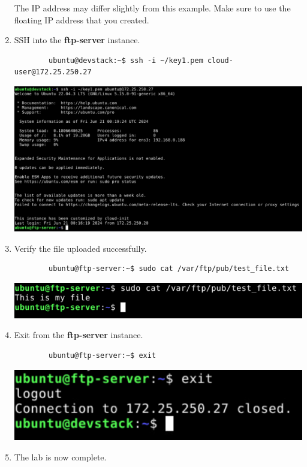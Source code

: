 \documentclass[letterpaper, 12pt]{article}
\begin{document}
\begin{enumerate}
    \begin{notebox}
        The IP address may differ slightly from this example. Make sure to use the floating IP address that you created.
    \end{notebox}

    \item SSH into the \textbf{ftp-server} instance.
    \begin{lstlisting}
        ubuntu@devstack:~$ ssh -i ~/key1.pem cloud-user@172.25.250.27
    \end{lstlisting}

    \begin{center}
        \includegraphics[width=\linewidth]{images/part2/step20.png}
    \end{center}

    \item Verify the file uploaded successfully.
    \begin{lstlisting}
        ubuntu@ftp-server:~$ sudo cat /var/ftp/pub/test_file.txt
    \end{lstlisting}

    \begin{center}
        \includegraphics[width=\linewidth]{images/part2/step21.png}
    \end{center}

    \item Exit from the \textbf{ftp-server} instance.
    \begin{lstlisting}
        ubuntu@ftp-server:~$ exit
    \end{lstlisting}

    \begin{center}
        \includegraphics[width=\linewidth]{images/part2/step22.png}
    \end{center}

    \item The lab is now complete.

\end{enumerate}
\end{document}
